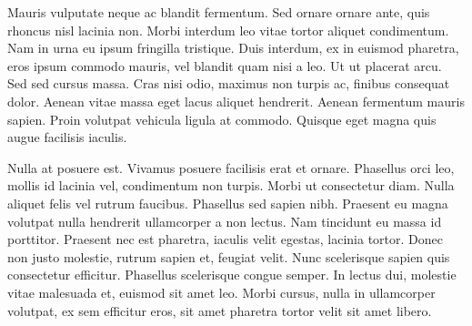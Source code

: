 Mauris vulputate neque ac blandit fermentum. Sed ornare ornare ante, quis rhoncus nisl lacinia non. Morbi interdum leo vitae tortor aliquet condimentum. Nam in urna eu ipsum fringilla tristique. Duis interdum, ex in euismod pharetra, eros ipsum commodo mauris, vel blandit quam nisi a leo. Ut ut placerat arcu. Sed sed cursus massa. Cras nisi odio, maximus non turpis ac, finibus consequat dolor. Aenean vitae massa eget lacus aliquet hendrerit. Aenean fermentum mauris sapien. Proin volutpat vehicula ligula at commodo. Quisque eget magna quis augue facilisis iaculis.

Nulla at posuere est. Vivamus posuere facilisis erat et ornare. Phasellus orci leo, mollis id lacinia vel, condimentum non turpis. Morbi ut consectetur diam. Nulla aliquet felis vel rutrum faucibus. Phasellus sed sapien nibh. Praesent eu magna volutpat nulla hendrerit ullamcorper a non lectus. Nam tincidunt eu massa id porttitor. Praesent nec est pharetra, iaculis velit egestas, lacinia tortor. Donec non justo molestie, rutrum sapien et, feugiat velit. Nunc scelerisque sapien quis consectetur efficitur. Phasellus scelerisque congue semper. In lectus dui, molestie vitae malesuada et, euismod sit amet leo. Morbi cursus, nulla in ullamcorper volutpat, ex sem efficitur eros, sit amet pharetra tortor velit sit amet libero.